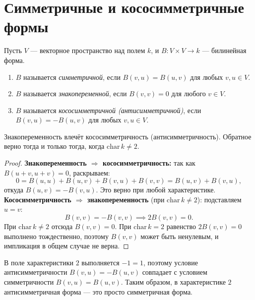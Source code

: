 \section{Симметричные и кососимметричные формы}

\begin{definition}
    Пусть $V$ --- векторное пространство над полем $k$, и $B\colon V \times V \to k$ --- билинейная форма.

    \begin{enumerate}
        \item $B$ называется \emph{симметричной}, если $B(v, u) = B(u, v)$ для любых $v, u \in V$.
        \item $B$ называется \emph{знакопеременной}, если $B(v, v) = 0$ для любого $v \in V$.
        \item $B$ называется \emph{кососимметричной (антисимметричной)}, если $B(v, u) = -B(u, v)$ для любых $v, u \in V$.
    \end{enumerate}
\end{definition}


\begin{stmt}
    Знакопеременность влечёт кососимметричность (антисимметричность). Обратное верно тогда и только тогда,
    когда $\mathrm{char}\, k \neq 2$.
    \begin{proof}
        \textbf{Знакопеременность $\Rightarrow$ кососимметричность:}
        так как $B(u+v, u+v) = 0$, раскрываем:
        \[
            0 = B(u,u) + B(u,v) + B(v,u) + B(v,v) = B(u,v) + B(v,u),
        \]
        откуда $B(u,v) = -B(v,u)$. Это верно при любой характеристике.
        \textbf{Кососимметричность $\Rightarrow$ знакопеременность} (при $\mathrm{char}\, k \neq 2$):
        подставляем $u = v$:
        \[
            B(v,v) = -B(v,v) \implies 2B(v,v) = 0.
        \]
        При $\mathrm{char}\, k \neq 2$ отсюда $B(v,v) = 0$.
        При $\mathrm{char}\, k = 2$ равенство $2B(v,v) = 0$ выполнено тождественно,
        поэтому $B(v,v)$ может быть ненулевым, и импликация в общем случае не верна.
    \end{proof}
\end{stmt}


\begin{remark}
    В поле характеристики $2$ выполняется $-1 = 1$, поэтому условие антисимметричности $B(v, u) = -B(u, v)$ совпадает с условием симметричности
    $B(v, u) = B(u, v)$. Таким образом, в характеристике $2$ антисимметричная форма --- это просто симметричная форма.
\end{remark}



